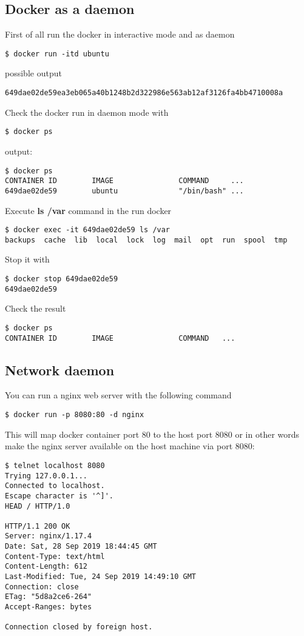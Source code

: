 \documentclass[14pt,a4paper]{article}
\begin{document}
\subsection{Docker as a daemon}
First of all run the docker in interactive mode and as daemon
\begin{verbatim}
$ docker run -itd ubuntu
\end{verbatim}
possible output
\begin{verbatim}
649dae02de59ea3eb065a40b1248b2d322986e563ab12af3126fa4bb4710008a
\end{verbatim}
Check the docker run in daemon mode with
\begin{verbatim}
$ docker ps
\end{verbatim}
output:
\begin{verbatim}
$ docker ps 
CONTAINER ID        IMAGE               COMMAND     ...
649dae02de59        ubuntu              "/bin/bash" ...
\end{verbatim}
Execute \textbf{ls /var} command in the run docker
\begin{verbatim}
$ docker exec -it 649dae02de59 ls /var
backups  cache  lib  local  lock  log  mail  opt  run  spool  tmp
\end{verbatim}
Stop it with
\begin{verbatim}
$ docker stop 649dae02de59
649dae02de59
\end{verbatim}
Check the result
\begin{verbatim}
$ docker ps
CONTAINER ID        IMAGE               COMMAND   ...
\end{verbatim}

\subsection{Network daemon}
You can run a nginx web server with the following command
\begin{verbatim}
$ docker run -p 8080:80 -d nginx
\end{verbatim}
This will map docker container port 80 to the host port 8080 or in
other words make the nginx server available on the host machine via port
8080:
\begin{verbatim}
$ telnet localhost 8080
Trying 127.0.0.1...
Connected to localhost.
Escape character is '^]'.
HEAD / HTTP/1.0

HTTP/1.1 200 OK
Server: nginx/1.17.4
Date: Sat, 28 Sep 2019 18:44:45 GMT
Content-Type: text/html
Content-Length: 612
Last-Modified: Tue, 24 Sep 2019 14:49:10 GMT
Connection: close
ETag: "5d8a2ce6-264"
Accept-Ranges: bytes

Connection closed by foreign host.
\end{verbatim}
\end{document}
